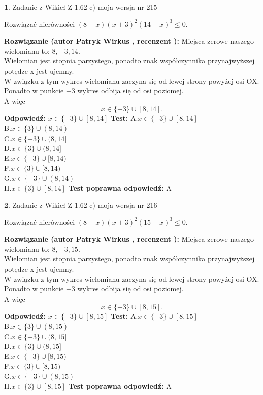 \documentclass[12pt, a4paper]{article}
\theoremstyle{definition} %
\newtheorem{zad}{}
\newcommand{\zadStart}[1]{\begin{zad}#1\newline}
\newcommand{\zadStop}{\end{zad}}
\newcommand{\rozwStart}[2]{\noindent \textbf{Rozwiązanie (autor #1 , recenzent #2): }\newline}
\newcommand{\rozwStop}{\newline}
\newcommand{\odpStart}{\noindent \textbf{Odpowiedź:}\newline}
\newcommand{\odpStop}{\newline}
\newcommand{\testStart}{\noindent \textbf{Test:}\newline}
\newcommand{\testStop}{\newline}
\newcommand{\kluczStart}{\noindent \textbf{Test poprawna odpowiedź:}\newline}
\newcommand{\kluczStop}{\newline}
\begin{document}
\zadStart{Zadanie z Wikieł Z 1.62 c) moja wersja nr 215}

Rozwiązać nierówności $(8-x)(x+3)^{2}(14-x)^{3}\le0$.
\zadStop
\rozwStart{Patryk Wirkus}{}
Miejsca zerowe naszego wielomianu to: $8, -3, 14$.\\
Wielomian jest stopnia parzystego, ponadto znak współczynnika przy\linebreak najwyższej potędze x jest ujemny.\\ W związku z tym wykres wielomianu zaczyna się od lewej strony powyżej osi OX.\\
Ponadto w punkcie $-3$ wykres odbija się od osi poziomej.\\
A więc $$x \in \{-3\} \cup [8,14].$$
\rozwStop
\odpStart
$x \in \{-3\} \cup [8,14]$
\odpStop
\testStart
A.$x \in \{-3\} \cup [8,14]$\\
B.$x \in \{3\} \cup (8,14)$\\
C.$x \in \{-3\} \cup (8,14]$\\
D.$x \in \{3\} \cup (8,14]$\\
E.$x \in \{-3\} \cup [8,14)$\\
F.$x \in \{3\} \cup [8,14)$\\
G.$x \in \{-3\} \cup (8,14)$\\
H.$x \in \{3\} \cup [8,14]$
\testStop
\kluczStart
A
\kluczStop



\zadStart{Zadanie z Wikieł Z 1.62 c) moja wersja nr 216}

Rozwiązać nierówności $(8-x)(x+3)^{2}(15-x)^{3}\le0$.
\zadStop
\rozwStart{Patryk Wirkus}{}
Miejsca zerowe naszego wielomianu to: $8, -3, 15$.\\
Wielomian jest stopnia parzystego, ponadto znak współczynnika przy\linebreak najwyższej potędze x jest ujemny.\\ W związku z tym wykres wielomianu zaczyna się od lewej strony powyżej osi OX.\\
Ponadto w punkcie $-3$ wykres odbija się od osi poziomej.\\
A więc $$x \in \{-3\} \cup [8,15].$$
\rozwStop
\odpStart
$x \in \{-3\} \cup [8,15]$
\odpStop
\testStart
A.$x \in \{-3\} \cup [8,15]$\\
B.$x \in \{3\} \cup (8,15)$\\
C.$x \in \{-3\} \cup (8,15]$\\
D.$x \in \{3\} \cup (8,15]$\\
E.$x \in \{-3\} \cup [8,15)$\\
F.$x \in \{3\} \cup [8,15)$\\
G.$x \in \{-3\} \cup (8,15)$\\
H.$x \in \{3\} \cup [8,15]$
\testStop
\kluczStart
A
\kluczStop
\end{document}
